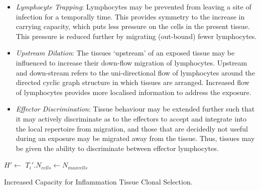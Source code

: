 \begin{itemize}
	\item \emph{Lymphocyte Trapping}: Lymphocytes may be prevented from leaving a site of infection for a temporally time. This provides symmetry to the increase in carrying capacity, which puts less pressure on the cells in the present tissue. This pressure is reduced further by migrating (out-bound) fewer lymphocytes.
	\item \emph{Upstream Dilation}: The tissues `upstream' of an exposed tissue may be influenced to increase their down-flow migration of lymphocytes. Upstream and down-stream refers to the uni-directional flow of lymphocytes around the directed cyclic graph structure in which tissues are arranged. Increased flow of lymphocytes provides more localised information to address the exposure.
	\item \emph{Effector Discrimination}: Tissue behaviour may be extended further such that it may actively discriminate as to the effectors to accept and integrate into the local repertoire from migration, and those that are decidedly not useful during an exposure may be migrated away from the tissue. Thus, tissues may be given the ability to discriminate between effector lymphocytes.
\end{itemize}

\begin{algorithm}[htp]
  \SetLine  
  
	
	{
		$H\prime \leftarrow$ \SelectTissuesToExpose{\Host}\;
		{
			\;
			$T_{i}\prime$.$N_{cells} \leftarrow N_{maxcells}$
		}		
	}
	\caption{Increased Capacity for Inflammation Tissue Clonal Selection.}
	\label{alg:tissues:algorithms:itcsa:increase}
\end{algorithm}

